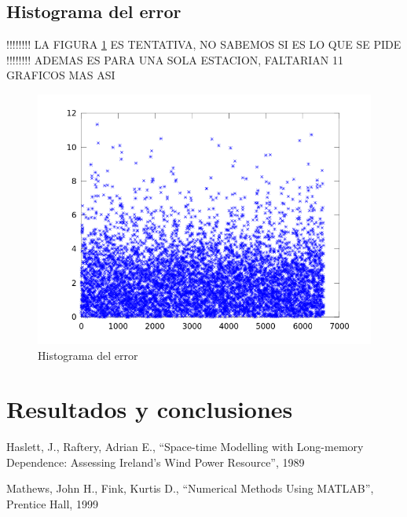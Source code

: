 \documentclass[journal, monochrome]{IEEEtran}
\begin{document}
\subsection{Histograma del error}
!!!!!!!! LA FIGURA \ref{figure:histo} ES TENTATIVA, NO SABEMOS SI ES LO QUE SE PIDE \\
!!!!!!!! ADEMAS ES PARA UNA SOLA ESTACION, FALTARIAN 11 GRAFICOS MAS ASI
\begin{figure}[h]
	\begin{center}
		\includegraphics[scale = 0.5]{img/histo.png}
		\caption{Histograma del error}
		\label{figure:histo}
	\end{center}
\end{figure}

\vspace{1cm}
\section{Resultados y conclusiones}
\label{section:results}



\vspace{1cm}

\begin{thebibliography}{1}

	Haslett, J.,
	Raftery, Adrian E.,
	``Space-time Modelling with
   	Long-memory Dependence: Assessing Ireland's Wind Power Resource'',
	1989 

	Mathews, John H.,
	Fink, Kurtis D.,
	``Numerical Methods Using MATLAB'',
	Prentice Hall,
	1999
	
\end{thebibliography}
\end{document}
